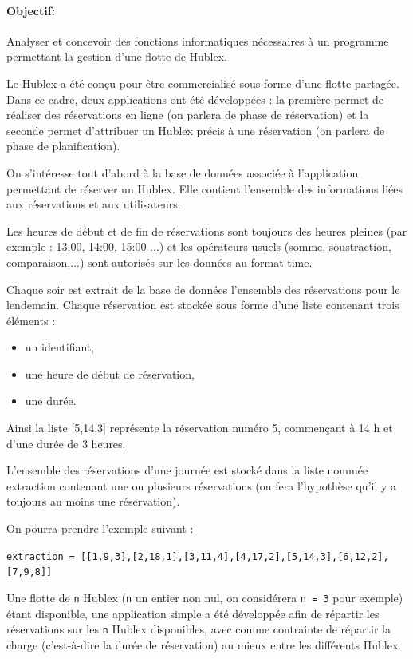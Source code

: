 \paragraph{Objectif:} Analyser et concevoir des fonctions informatiques nécessaires à un programme permettant la gestion d'une flotte de Hublex.

Le Hublex a été conçu pour être commercialisé sous forme d'une flotte partagée. Dans ce cadre, deux applications ont été développées : la première permet de réaliser des réservations en ligne (on parlera de phase de réservation) et la seconde permet d'attribuer un Hublex précis à une réservation (on parlera de phase de planification).

On s'intéresse tout d'abord à la base de données associée à l'application permettant de réserver un
Hublex. Elle contient l'ensemble des informations liées aux réservations et aux utilisateurs.

Les heures de début et de fin de réservations sont toujours des heures pleines (par exemple : 13:00, 14:00, 15:00 ...) et les opérateurs usuels (somme, soustraction, comparaison,...) sont
autorisés sur les données au format time.

Chaque soir est extrait de la base de données l'ensemble des réservations pour le lendemain. Chaque
réservation est stockée sous forme d'une liste contenant trois éléments :
\begin{itemize}
 \item un identifiant,
 \item une heure de début de réservation,
 \item une durée.
\end{itemize}

Ainsi la liste [5,14,3] représente la réservation numéro 5, commençant à 14 h et d'une durée de 3 heures. 

L'ensemble des réservations d'une journée est stocké dans la liste nommée extraction contenant une ou plusieurs réservations (on fera l'hypothèse qu'il y a toujours au moins une réservation).

On pourra prendre l'exemple suivant :
\begin{center}
\texttt{extraction = [[1,9,3],[2,18,1],[3,11,4],[4,17,2],[5,14,3],[6,12,2],[7,9,8]]}
\end{center}

Une flotte de \verb?n? Hublex (\verb?n? un entier non nul, on considérera \verb?n = 3? pour exemple) étant disponible, une application simple a été développée afin de répartir les réservations sur les \verb?n? Hublex disponibles, avec comme contrainte de répartir la charge (c'est-à-dire la durée de réservation) au mieux entre les différents Hublex.

